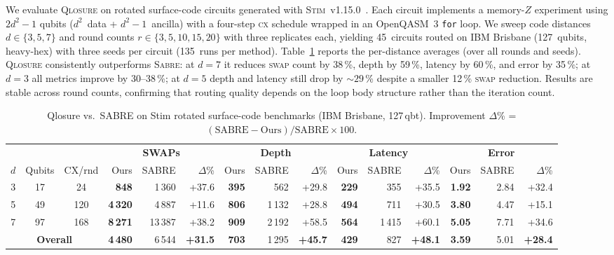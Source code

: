 
We evaluate \textsc{Qlosure} on rotated surface-code circuits generated with
\textsc{Stim}~v1.15.0~\cite{gidney2021stim}.
Each circuit implements a memory-$Z$ experiment using $2d^{2}-1$ qubits
($d^{2}$~data + $d^{2}-1$~ancilla) with a four-step \textsc{cx} schedule
wrapped in an OpenQASM~3 \texttt{for} loop.
We sweep code distances $d\in\{3,5,7\}$ and round counts
$r\in\{3,5,10,15,20\}$ with three replicates each, yielding 45~circuits
routed on IBM Brisbane (127~qubits, heavy-hex) with three seeds per circuit
(135~runs per method).
Table~\ref{tab:stim-summary} reports the per-distance averages (over all
rounds and seeds).
\textsc{Qlosure} consistently outperforms \textsc{Sabre}: at $d{=}7$ it
reduces \textsc{swap} count by 38\,\%, depth by 59\,\%, latency by 60\,\%,
and error by 35\,\%; at $d{=}3$ all metrics improve by 30--38\,\%; at
$d{=}5$ depth and latency still drop by ${\sim}29$\,\% despite a smaller
12\,\% \textsc{swap} reduction.
Results are stable across round counts, confirming that routing quality
depends on the loop body structure rather than the iteration count.

\begin{table}[t]
  \centering
  \caption{Qlosure vs.\ SABRE on Stim rotated surface-code benchmarks
           (IBM Brisbane, 127\,qbt). Improvement $\Delta$\% =
           $(\text{SABRE}-\text{Ours})/\text{SABRE}\times 100$.}
  \label{tab:stim-summary}
  \begin{tabular}{c c c  rr r  rr r  rr r  rr r}
    \toprule
    & & &
    \multicolumn{3}{c}{\textbf{SWAPs}} &
    \multicolumn{3}{c}{\textbf{Depth}} &
    \multicolumn{3}{c}{\textbf{Latency}} &
    \multicolumn{3}{c}{\textbf{Error}} \\
    \cmidrule(lr){4-6} \cmidrule(lr){7-9} \cmidrule(lr){10-12} \cmidrule(lr){13-15}
    $d$ & Qubits & CX/rnd &
    Ours & SABRE & $\Delta$\% &
    Ours & SABRE & $\Delta$\% &
    Ours & SABRE & $\Delta$\% &
    Ours & SABRE & $\Delta$\% \\
    \midrule
    3 &  17 &  24 & \textbf{848}   & 1\,360  & +37.6 & \textbf{395}  & 562   & +29.8 & \textbf{229}  & 355   & +35.5 & \textbf{1.92} & 2.84 & +32.4 \\
    5 &  49 & 120 & \textbf{4\,320} & 4\,887  & +11.6 & \textbf{806}  & 1\,132 & +28.8 & \textbf{494}  & 711   & +30.5 & \textbf{3.80} & 4.47 & +15.1 \\
    7 &  97 & 168 & \textbf{8\,271} & 13\,387 & +38.2 & \textbf{909}  & 2\,192 & +58.5 & \textbf{564}  & 1\,415 & +60.1 & \textbf{5.05} & 7.71 & +34.6 \\
    \midrule
    \multicolumn{3}{c}{\textbf{Overall}} &
    \textbf{4\,480} & 6\,544 & \textbf{+31.5} &
    \textbf{703}  & 1\,295 & \textbf{+45.7} &
    \textbf{429}  &  827   & \textbf{+48.1} &
    \textbf{3.59} & 5.01   & \textbf{+28.4} \\
    \bottomrule
  \end{tabular}
\end{table}

